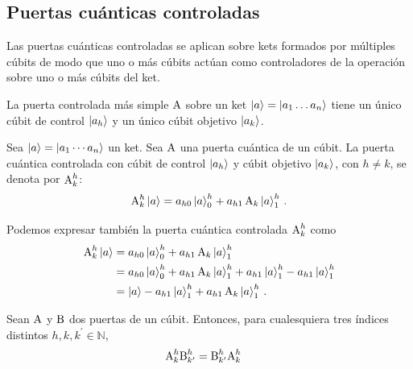 \subsection{Puertas cuánticas controladas}
Las puertas cuánticas controladas se aplican sobre kets formados por múltiples cúbits de modo que uno o más cúbits actúan como controladores de la operación sobre uno o más cúbits del ket.

La puerta controlada más simple $\text{A}$ sobre un ket $\ket{a}=\ket{a_1\dots a_n}$ tiene un único cúbit de control $\ket{a_h}$ y un único cúbit objetivo $\ket{a_k}$.

\begin{notation}
  Sea $\ket{a}=\ket{a_1\cdots a_n}$ un ket.
  Sea $\text{A}$ una puerta cuántica de un cúbit.
  La puerta cuántica controlada con cúbit de control $\ket{a_h}$ y cúbit objetivo $\ket{a_k}$, con $h\neq k$, se denota por $\text{A}^{h}_{k}$:
  \begin{equation}
    \label{eq:generic-controlled-gate}
    \text{A}^{h}_{k}\ket{a} = a_{h0}\ket{a}^{h}_{0}+a_{h1}\, \text{A}_k\ket{a}^{h}_{1}\,.
  \end{equation}
\end{notation}

Podemos expresar también la puerta cuántica controlada $\text{A}^{h}_{k}$ como
\begin{align*}
  \text{A}^{h}_{k}\ket{a} & =a_{h0}\ket{a}^{h}_{0}+a_{h1}\, \text{A}_k\ket{a}^{h}_{1}                                                    \\
                             & =a_{h0}\ket{a}^{h}_{0}+a_{h1}\, \text{A}_k\ket{a}^{h}_{1}+a_{h1}\ket{a}^{h}_{1}-a_{h1} \ket{a}^{h}_{1} \\
                             & =\ket{a}-a_{h1} \ket{a}^{h}_{1}+a_{h1}\, \text{A}_k\ket{a}^{h}_{1}\,.
\end{align*}

\begin{proposition}
  Sean $\text{A}$ y $\text{B}$ dos puertas de un cúbit.
  Entonces, para cualesquiera tres índices distintos $h,k,k^\prime \in \mathbb{N}$,
  \begin{align}
    \label{eq:conmutacion-cgates}
    \text{A}^{h}_{k}\text{B}^{h}_{k^\prime} & = \text{B}^{h}_{k^\prime}\text{A}^{h}_{k}
  \end{align}
\end{proposition}

